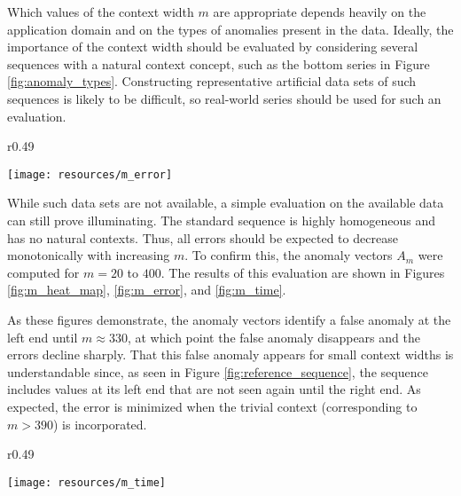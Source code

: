 Which values of the context width $m$ are appropriate depends heavily on the application domain and on the types of anomalies present in the data. Ideally, the importance of the context width should be evaluated by considering several sequences with a natural context concept, such as the bottom series in Figure \ref{fig:anomaly_types}. Constructing representative artificial data sets of such sequences is likely to be difficult, so real-world series should be used for such an evaluation.

\begin{wrapfigure}{r}{0.49\textwidth} \vspace{-20pt}
    \vspace{-10pt}
    \begin{center}
        \texttt{[image: resources/m\_error]}
    \end{center}
    \vspace{-20pt}
    \caption{\small{Errors of the anomaly vectors $A_m$.}}
    \vspace{-20pt}
    \label{fig:m_error}
\end{wrapfigure}

While such data sets are not available, a simple evaluation on the available data can still prove illuminating. The standard sequence is highly homogeneous and has no natural contexts. Thus, all errors should be expected to decrease monotonically with increasing $m$. To confirm this, the anomaly vectors $A_m$ were computed for $m = 20$ to $400$. The results of this evaluation are shown in Figures \ref{fig:m_heat_map}, \ref{fig:m_error}, and \ref{fig:m_time}. 

As these figures demonstrate, the anomaly vectors identify a false anomaly at the left end until $m \approx 330$, at which point the false anomaly disappears and the errors decline sharply. That this false anomaly appears for small context widths is understandable since, as seen in Figure \ref{fig:reference_sequence}, the sequence includes values at its left end that are not seen again until the right end. As expected, the error is minimized when the trivial context (corresponding to $m > 390$) is incorporated.

\begin{wrapfigure}{r}{0.49\textwidth}
    \vspace{-30pt}
    \begin{center}
        \texttt{[image: resources/m\_time]}
    \end{center}
    \vspace{-20pt}
    \caption{\small{Evaluation times of the anomaly vectors $A_m$.}}
    \vspace{-20pt}
    \label{fig:m_time}
\end{wrapfigure}

